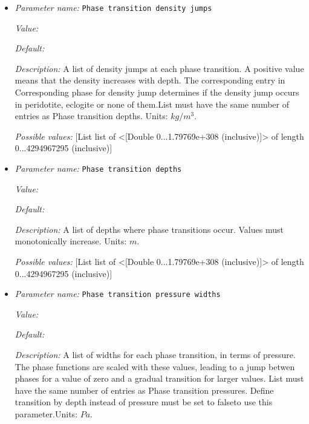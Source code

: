 \begin{itemize}
{\it Possible values:} [List list of <[Double -1.79769e+308...1.79769e+308 (inclusive)]> of length 0...4294967295 (inclusive)]
\item {\it Parameter name:} {\tt Phase transition density jumps}
\label{parameters:Material model/Latent heat/Phase transition density jumps}


{\it Value:} 


{\it Default:} 


{\it Description:} A list of density jumps at each phase transition. A positive value means that the density increases with depth. The corresponding entry in Corresponding phase for density jump determines if the density jump occurs in peridotite, eclogite or none of them.List must have the same number of entries as Phase transition depths. Units: $kg/m^3$.


{\it Possible values:} [List list of <[Double 0...1.79769e+308 (inclusive)]> of length 0...4294967295 (inclusive)]
\item {\it Parameter name:} {\tt Phase transition depths}
\label{parameters:Material model/Latent heat/Phase transition depths}


{\it Value:} 


{\it Default:} 


{\it Description:} A list of depths where phase transitions occur. Values must monotonically increase. Units: $m$.


{\it Possible values:} [List list of <[Double 0...1.79769e+308 (inclusive)]> of length 0...4294967295 (inclusive)]
\item {\it Parameter name:} {\tt Phase transition pressure widths}
\label{parameters:Material model/Latent heat/Phase transition pressure widths}


{\it Value:} 


{\it Default:} 


{\it Description:} A list of widths for each phase transition, in terms of pressure. The phase functions are scaled with these values, leading to a jump betwen phases for a value of zero and a gradual transition for larger values. List must have the same number of entries as Phase transition pressures. Define transition by depth instead of pressure must be set to falseto use this parameter.Units: $Pa$.



\end{itemize}

